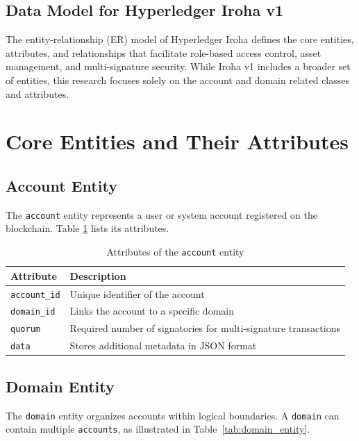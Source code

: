 \documentclass{article}
\begin{document}
\subsection{ Data Model for Hyperledger Iroha v1}

The entity-relationship (ER) model of Hyperledger Iroha defines the core entities, attributes, and relationships that facilitate role-based access control, asset management, and multi-signature security. While Iroha v1 includes a broader set of entities, this research focuses solely on the account and domain related classes and attributes.

\section{Core Entities and Their Attributes}
\subsection{Account Entity}
The \texttt{account} entity represents a user or system account registered on the blockchain. Table \ref{tab:account_entity} lists its attributes.

\begin{table}[h]
      \centering
      \renewcommand{\arraystretch}{1.2}
      \caption{Attributes of the \texttt{account} entity}
      \label{tab:account_entity}
      \begin{tabularx}{\textwidth}{|l|X|}
            \hline
            \textbf{Attribute}   & \textbf{Description}                                            \\ \hline
            \texttt{account\_id} & Unique identifier of the account                                \\ \hline
            \texttt{domain\_id}  & Links the account to a specific domain                          \\ \hline
            \texttt{quorum}      & Required number of signatories for multi-signature transactions \\ \hline
            \texttt{data}        & Stores additional metadata in JSON format                       \\ \hline
      \end{tabularx}
\end{table}


\subsection{Domain Entity}
The \texttt{domain} entity organizes accounts within logical boundaries. A \texttt{domain} can contain multiple \texttt{accounts}, as illustrated in Table~\ref{tab:domain_entity}.
\end{document}
